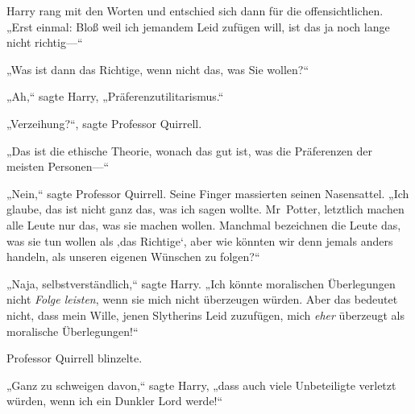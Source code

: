Harry rang mit den Worten und entschied sich dann für die offensichtlichen. „Erst einmal: Bloß weil ich jemandem Leid zufügen will, ist das ja noch lange nicht richtig—“

„Was ist dann das Richtige, wenn nicht das, was Sie wollen?“

„Ah,“ sagte Harry, „Präferenzutilitarismus.“

„Verzeihung?“, sagte Professor Quirrell.

„Das ist die ethische Theorie, wonach das gut ist, was die Präferenzen der meisten Personen—“

„Nein,“ sagte Professor Quirrell. Seine Finger massierten seinen Nasensattel. „Ich glaube, das ist nicht ganz das, was ich sagen wollte. Mr~Potter, letztlich machen alle Leute nur das, was sie machen wollen. Manchmal bezeichnen die Leute das, was sie tun wollen als ‚das Richtige‘, aber wie könnten wir denn jemals anders handeln, als unseren eigenen Wünschen zu folgen?“

„Naja, selbstverständlich,“ sagte Harry. „Ich könnte moralischen Überlegungen nicht \emph{Folge leisten}, wenn sie mich nicht überzeugen würden. Aber das bedeutet nicht, dass mein Wille, jenen Slytherins Leid zuzufügen, mich \emph{eher} überzeugt als moralische Überlegungen!“

Professor Quirrell blinzelte.

„Ganz zu schweigen davon,“ sagte Harry, „dass auch viele Unbeteiligte verletzt würden, wenn ich ein Dunkler Lord werde!“

